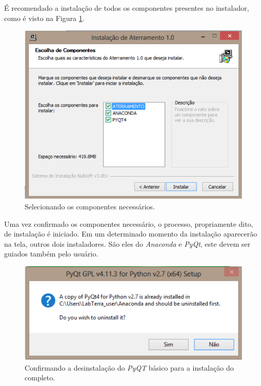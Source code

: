 \documentclass[a4paper, 10pt]{article}
\begin{document}
É recomendado a instalação de todos os componentes presentes no instalador, como é 
visto na Figura \ref{fig_selecionando_componentes_externos}. 

\begin{figure}[!h]
        \caption{\label{fig_selecionando_componentes_externos}Selecionando os componentes necessários.}
	    \begin{center}
            \includegraphics[scale=0.7]{../fotos/instalacao/parte2_selecionando_componentes.pdf}
	    \end{center}
\end{figure}

Uma vez confirmado os componentes necessário, o processo, propriamente dito, de instalação 
é iniciado. Em um determinado momento da instalação aparecerão na tela, outros dois instaladores. 
São eles do \textit{Anaconda} e \textit{PyQt}, este devem ser guiados também pelo usuário.

\begin{figure}[!h]
    \caption{\label{fig_pyqt_antigo}Confirmando a desinstalação do \textit{PyQT} básico para a instalação do completo.}
	    \begin{center}
            \includegraphics[scale=0.6]{../fotos/instalacao/parte6_pyqt.pdf}
	    \end{center}
\end{figure}
\end{document}
